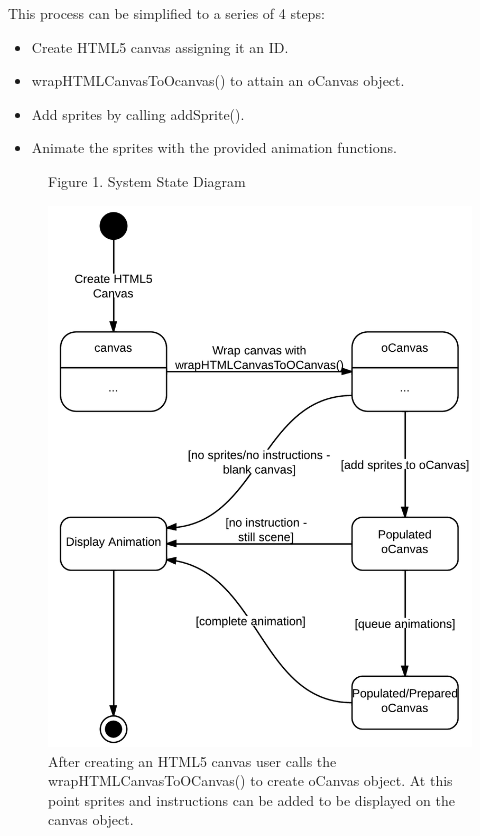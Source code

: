 \documentclass[12pt]{article}
\begin{document}
This process can be simplified to a series of 4 steps:
\begin{itemize}
\item Create HTML5 canvas assigning it an ID.
\item wrapHTMLCanvasToOcanvas() to attain an oCanvas object.
\item Add sprites by calling addSprite().
\item Animate the sprites with the provided animation functions.\\
\end{itemize}

\begin{figure}
\caption{Figure 1. System State Diagram}
  \centering
    \includegraphics[scale=.3]{animation-statediagram.png}
    \caption*{After creating an HTML5 canvas user calls the wrapHTMLCanvasToOCanvas() to create oCanvas object. At this point sprites and instructions can be added to be displayed on the canvas object.}
    \end{figure}
\end{document}

